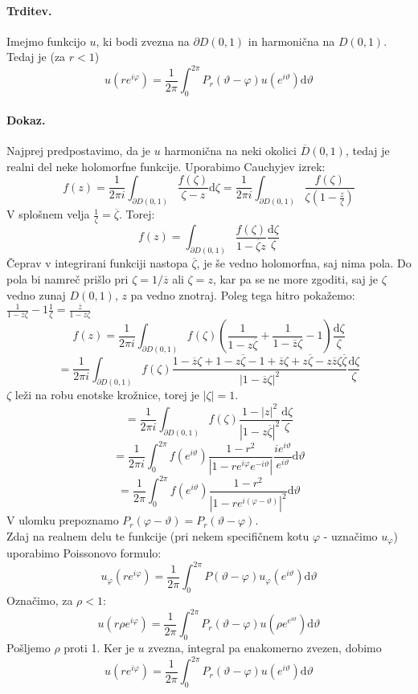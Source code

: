 \documentclass[a4paper]{article}
\newcommand{\dif}{\mathrm{d}}
\begin{document}
\paragraph{Trditev.} Imejmo funkcijo $u$, ki bodi zvezna na $\partial D(0, 1)$ in harmonična na $D(0, 1)$. Tedaj je (za $r < 1$)
$$u(re^{i\varphi}) = \frac{1}{2\pi}\int_{0}^{2\pi} P_r\left(\vartheta - \varphi\right)u(e^{i\vartheta})\dif\vartheta$$
\paragraph{Dokaz.} Najprej predpostavimo, da je $u$ harmonična na neki okolici $\overline{D}(0, 1)$, tedaj je realni del neke holomorfne funkcije.
Uporabimo Cauchyjev izrek:
$$f(z) = \frac{1}{2\pi i} \int_{\partial D(0, 1)} \frac{f(\zeta)}{\zeta - z}\dif\zeta = \frac{1}{2\pi i}\int_{\partial D(0, 1)} \frac{f(\zeta)}{\zeta\left(1 - \frac{z}{\zeta}\right)}$$
V splošnem velja $\displaystyle{\frac{1}{\zeta} = \overline{\zeta}}$. Torej:
$$f(z) = \int_{\partial D(0, 1)} \frac{f(\zeta)}{1 - \overline{\zeta}z}\frac{\dif \zeta}{\zeta}$$
Čeprav v integrirani funkciji nastopa $\overline{\zeta}$, je še vedno holomorfna, saj nima pola. Do pola bi namreč prišlo pri $\zeta = 1/\overline{z}$ ali $\zeta = z$, kar pa se ne more zgoditi, saj je $\zeta$
vedno zunaj $D(0, 1)$, $z$ pa vedno znotraj. Poleg tega hitro pokažemo: $\displaystyle{\frac{1}{1-\overline{z}\zeta} - 1}\frac{1}{\zeta} = \frac{\overline{z}}{1 - \overline{z}\zeta}$
$$f(z) = \frac{1}{2\pi i}\int_{\partial D(0, 1)} f(\zeta)\left(\frac{1}{1-z\overline{\zeta}} + \frac{1}{1 - \overline{z}\zeta} - 1\right)\frac{\dif\zeta}{\zeta}$$
$$=\frac{1}{2\pi i}\int_{\partial D(0, 1)}f(\zeta) \frac{1 - \overline{z}\zeta + 1 - z\overline{\zeta} - 1 + \overline{z}\zeta + z\overline{\zeta} - z\overline{z}\zeta\overline{\zeta}}{|1-\overline{z}\zeta|^2}\frac{\dif\zeta}{\zeta}$$
$\zeta$ leži na robu enotske krožnice, torej je $|\zeta| = 1$.
$$= \frac{1}{2\pi i}\int_{\partial D(0, 1)} f(\zeta) \frac{1 - |z|^2}{|1 - z\overline{\zeta}|^2}\frac{\dif\zeta}{\zeta}$$
$$= \frac{1}{2\pi i}\int_{0}^{2\pi} f(e^{i\vartheta})\frac{1 - r^2}{|1 - re^{i\varphi}e^{-i\vartheta}|}\frac{ie^{i\vartheta}}{e^{i\vartheta}}\dif\vartheta$$
$$= \frac{1}{2\pi} \int_{0}^{2\pi} f(e^{i\vartheta})\frac{1 - r^2}{|1 - re^{i(\varphi - \vartheta)}|^2}\dif\vartheta$$
V ulomku prepoznamo $P_r(\varphi - \vartheta) = P_r(\vartheta - \varphi)$. \\[2mm]
Zdaj na realnem delu te funkcije (pri nekem specifičnem kotu $\varphi$ - uznačimo $u_\varphi$) uporabimo Poissonovo formulo:
$$u_\varphi(re^{i\varphi}) = \frac{1}{2\pi}\int_{0}^{2\pi} P(\vartheta - \varphi) u_\varphi(e^{i\vartheta})\dif\vartheta$$
Označimo, za $\rho < 1$:
$$u(r\rho e^{i\varphi}) = \frac{1}{2\pi} \int_{0}^{2\pi} P_r(\vartheta - \varphi) u(\rho e^{e^{i\vartheta}}) \dif\vartheta$$
Pošljemo $\rho$ proti 1. Ker je $u$ zvezna, integral pa enakomerno zvezen, dobimo
$$u(re^{i\varphi}) = \frac{1}{2\pi} \int_{0}^{2\pi} P_r(\vartheta - \varphi) u(e^{i\vartheta}) \dif\vartheta$$
\end{document}
